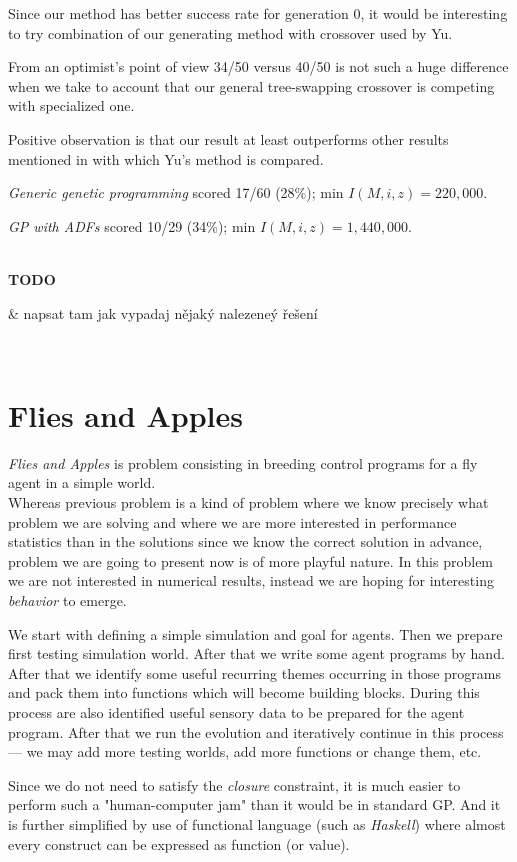 \documentclass[12pt,a4paper]{report}
\newenvironment{todo}
{ ~\\[0.5em]
  {\color{red}\textbf{TODO}}
  \begin{easylist}[itemize]}
{ \end{easylist}
  ~}
\begin{document}
Since our method has better success rate for generation 0, it would 
be interesting to try combination of our generating 
method with crossover used by Yu.

From an optimist's point of view 34/50 versus 40/50 
is not such a huge difference when we take to account that
our general tree-swapping crossover is competing with specialized one.   

Positive observation is that our result at least outperforms 
other results mentioned in \cite{yu01} with which Yu's method is compared.


\textit{Generic genetic programming} scored 17/60 (28\%); 
min $I(M,i,z) = 220,000$.

\textit{GP with ADFs} scored 10/29 (34\%); 
min $I(M,i,z) = 1,440,000$.




\begin{todo}
& napsat tam jak vypadaj nějaký nalezeneý řešení
\end{todo} 

\newpage
\section{Flies and Apples}

\textit{Flies and Apples} is problem consisting in breeding 
control programs for a fly agent in a simple world.\\ 

Whereas previous problem is a kind of problem where we know precisely
what problem we are solving and where we are more interested in 
performance statistics than in the solutions since we know the correct solution in 
advance, problem we are going to present now is of more playful nature.
In this problem we are not interested in numerical results, instead 
we are hoping for interesting \textit{behavior} to emerge.

We start with defining a simple simulation and goal for agents.
Then we prepare first testing simulation world. 
After that we write some agent programs by hand. After that we 
identify some useful recurring 
themes occurring in those programs and pack them into functions
which will become building blocks. During this process are also identified
useful sensory data to be prepared for the agent program.
After that we run the evolution and
iteratively continue in this process  --- we may add more testing worlds,
add more functions or change them, etc.
      
Since we do not need to satisfy the \textit{closure} constraint, 
it is much easier to perform such a "human-computer jam" than it
would be in standard GP. And it is further simplified by use of
functional language (such as \textit{Haskell}) where almost
every construct can be expressed as function (or value).
\end{document}
